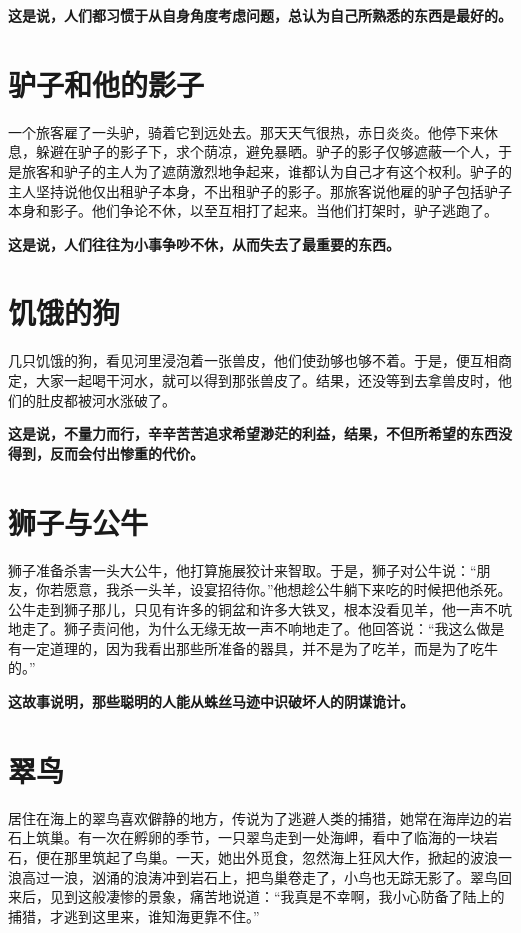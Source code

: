 {\bfseries \color{red}这是说，人们都习惯于从自身角度考虑问题，总认为自己所熟悉的东西是最好的。}

\section{驴子和他的影子}

一个旅客雇了一头驴，骑着它到远处去。那天天气很热，赤日炎炎。他停下来休息，躲避在驴子的影子下，求个荫凉，避免暴晒。驴子的影子仅够遮蔽一个人，于是旅客和驴子的主人为了遮荫激烈地争起来，谁都认为自己才有这个权利。驴子的主人坚持说他仅出租驴子本身，不出租驴子的影子。那旅客说他雇的驴子包括驴子本身和影子。他们争论不休，以至互相打了起来。当他们打架时，驴子逃跑了。

{\bfseries \color{red}这是说，人们往往为小事争吵不休，从而失去了最重要的东西。}

\section{饥饿的狗}

几只饥饿的狗，看见河里浸泡着一张兽皮，他们使劲够也够不着。于是，便互相商定，大家一起喝干河水，就可以得到那张兽皮了。结果，还没等到去拿兽皮时，他们的肚皮都被河水涨破了。

{\bfseries \color{red}这是说，不量力而行，辛辛苦苦追求希望渺茫的利益，结果，不但所希望的东西没得到，反而会付出惨重的代价。}

\section{狮子与公牛}

狮子准备杀害一头大公牛，他打算施展狡计来智取。于是，狮子对公牛说：“朋友，你若愿意，我杀一头羊，设宴招待你。”他想趁公牛躺下来吃的时候把他杀死。公牛走到狮子那儿，只见有许多的铜盆和许多大铁叉，根本没看见羊，他一声不吭地走了。狮子责问他，为什么无缘无故一声不响地走了。他回答说：“我这么做是有一定道理的，因为我看出那些所准备的器具，并不是为了吃羊，而是为了吃牛的。”

{\bfseries \color{red}这故事说明，那些聪明的人能从蛛丝马迹中识破坏人的阴谋诡计。}

\section{翠鸟}

居住在海上的翠鸟喜欢僻静的地方，传说为了逃避人类的捕猎，她常在海岸边的岩石上筑巢。有一次在孵卵的季节，一只翠鸟走到一处海岬，看中了临海的一块岩石，便在那里筑起了鸟巢。一天，她出外觅食，忽然海上狂风大作，掀起的波浪一浪高过一浪，汹涌的浪涛冲到岩石上，把鸟巢卷走了，小鸟也无踪无影了。翠鸟回来后，见到这般凄惨的景象，痛苦地说道：“我真是不幸啊，我小心防备了陆上的捕猎，才逃到这里来，谁知海更靠不住。”

